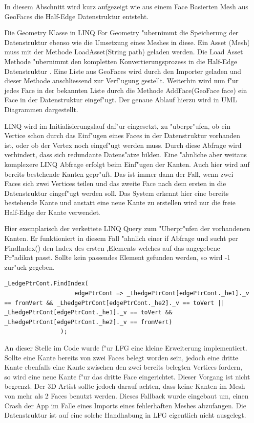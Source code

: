 \documentclass[pagesize, paper=a4, fontsize=12pt,titlepage=true, headings=small, headnosepline, abstractoff, liststotoc, nochapterprefix, plainheadsepline]{scrreprt}
\newcommand{\LFGS}{LINQ For Geometry }
\newcommand{\HES}{Half-Edge Datenstruktur }
\begin{document}
			In diesem Abschnitt wird kurz aufgezeigt wie aus einem Face Basierten Mesh aus GeoFaces die \HES entsteht.

Die Geometry Klasse in \LFGS "ubernimmt die Speicherung der Datenstruktur ebenso wie die Umsetzung eines Meshes in diese. Ein Asset (Mesh) muss mit der Methode LoadAsset(String path) geladen werden. Die Load Asset Methode "ubernimmt den kompletten Konvertierungsprozess in die \HES. Eine Liste aus GeoFaces wird durch den Importer geladen und dieser Methode anschliessend zur Verf"ugung gestellt. Weiterhin wird nun f"ur jedes Face in der bekannten Liste durch die Methode AddFace(GeoFace face) ein Face in der Datenstruktur eingef"ugt. Der genaue Ablauf hierzu wird in UML Diagrammen dargestellt.

LINQ wird im Initialisierungslauf daf"ur eingesetzt, zu "uberpr"ufen, ob ein Vertice schon durch das Einf"ugen eines Faces in der Datenstruktur vorhanden ist, oder ob der Vertex noch eingef"ugt werden muss. Durch diese Abfrage wird verhindert, dass sich redundante Datens"atze bilden. Eine "ahnliche aber weitaus komplexere LINQ Abfrage erfolgt beim Einf"ugen der Kanten. Auch hier wird auf bereits bestehende Kanten gepr"uft. Das ist immer dann der Fall, wenn zwei Faces sich zwei Vertices teilen und das zweite Face nach dem ersten in die Datenstruktur eingef"ugt werden soll. Das System erkennt hier eine bereits bestehende Kante und anstatt eine neue Kante zu erstellen wird nur die freie Half-Edge der Kante verwendet.
\newline

Hier exemplarisch der verkettete LINQ Query zum "Uberpr"ufen der vorhandenen Kanten. Er funktioniert in diesem Fall "ahnlich einer if Abfrage und sucht per FindIndex() den Index des ersten ,Elements welches auf das angegebene Pr"adikat passt. Sollte kein passendes Element gefunden werden, so wird -1 zur"uck gegeben.

\begin{lstlisting}
_LedgePtrCont.FindIndex(
                    edgePtrCont => _LhedgePtrCont[edgePtrCont._he1]._v == fromVert && _LhedgePtrCont[edgePtrCont._he2]._v == toVert || _LhedgePtrCont[edgePtrCont._he1]._v == toVert && _LhedgePtrCont[edgePtrCont._he2]._v == fromVert)
                );
\end{lstlisting}

An dieser Stelle im Code wurde f"ur LFG eine kleine Erweiterung implementiert. Sollte eine Kante bereits von zwei Faces belegt worden sein, jedoch eine dritte Kante ebenfalls eine Kante zwischen den zwei bereits belegten Vertices fordern, so wird eine neue Kante f"ur das dritte Face eingerichtet. Dieser Vorgang ist nicht begrenzt. Der 3D Artist sollte jedoch darauf achten, dass keine Kanten im Mesh von mehr als 2 Faces benutzt werden. Dieses Fallback wurde eingebaut um, einen Crash der App im Falle eines Imports eines fehlerhaften Meshes abzufangen. Die Datenstruktur ist auf eine solche Handhabung in LFG eigentlich nicht ausgelegt.
\end{document}
